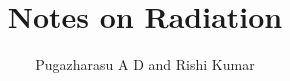 \documentclass[a4paper,12pt]{book}
\begin{document}
\author{Pugazharasu A D and Rishi Kumar}
\title{Notes on Radiation}


\frontmatter
\maketitle
\tableofcontents

\mainmatter



\backmatter
\end{document}
